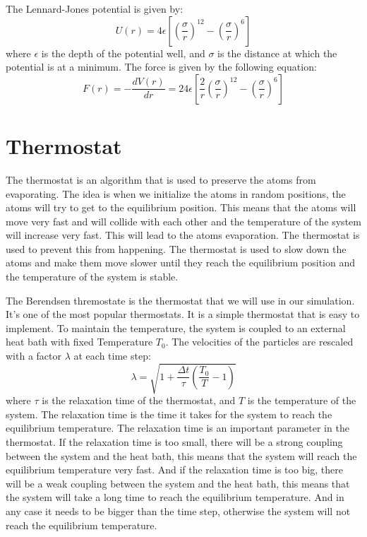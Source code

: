     The Lennard-Jones potential is given by:
    \begin{equation}
        U(r) = 4\epsilon\left[\left(\frac{\sigma}{r}\right)^{12}-\left(\frac{\sigma}{r}\right)^6\right]
    \end{equation}
    where $\epsilon$ is the depth of the potential well, and $\sigma$ is the distance at which the potential is at a minimum.
    The force is given by the following equation:
    \begin{equation}
        F(r) = -\frac{dV(r)}{dr} = 24\epsilon\left[\frac{2}{r}\left(\frac{\sigma}{r}\right)^{12}-\left(\frac{\sigma}{r}\right)^6\right]
    \end{equation}


\section{Thermostat}
    The thermostat is an algorithm that is used to preserve the atoms from evaporating. The idea is when we initialize the atoms in random positions, the atoms will try to get to the equilibrium position. This means that the atoms will move very fast and will collide with each other and the temperature of the system will increase very fast. This will lead to the atoms evaporation. The thermostat is used to prevent this from happening. The thermostat is used to slow down the atoms and make them move slower until they reach the equilibrium position and the temperature of the system is stable. 
    
    The Berendsen thremostate is the thermostat that we will use in our simulation. It's one of the most popular thermostats. It is a simple thermostat that is easy to implement. To maintain the temperature, the system is coupled to an external heat bath with fixed Temperature $T_{0}$\cite{berendsen1984molecular}. The
    velocities of the particles are rescaled with a factor $\lambda$ at each time step:
    \begin{equation}
        \lambda = \sqrt{1+\frac{\Delta t}{\tau}\left(\frac{T_{0}}{T}-1\right)}
    \end{equation}
    where $\tau$ is the relaxation time of the thermostat, and $T$ is the temperature of the system. The relaxation time is the time it takes for the system to reach the equilibrium temperature. The relaxation time is an important parameter in the thermostat. If the relaxation time is too small, there will be a strong coupling between the system and the heat bath, this means that the system will reach the equilibrium temperature very fast. And if the relaxation time is too big, there will be a weak coupling between the system and the heat bath, this means that the system will take a long time to reach the equilibrium temperature.
    And in any case it needs to be bigger than the time step, otherwise the system will not reach the equilibrium temperature.


